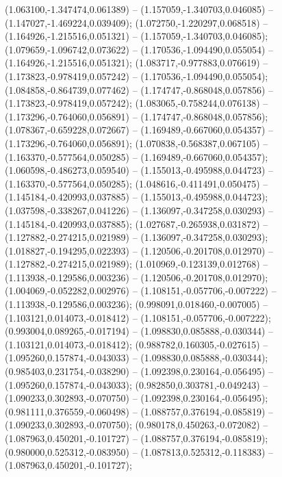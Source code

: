  (1.063100,-1.347474,0.061389) -- (1.157059,-1.340703,0.046085) -- (1.147027,-1.469224,0.039409);
 (1.072750,-1.220297,0.068518) -- (1.164926,-1.215516,0.051321) -- (1.157059,-1.340703,0.046085);
 (1.079659,-1.096742,0.073622) -- (1.170536,-1.094490,0.055054) -- (1.164926,-1.215516,0.051321);
 (1.083717,-0.977883,0.076619) -- (1.173823,-0.978419,0.057242) -- (1.170536,-1.094490,0.055054);
 (1.084858,-0.864739,0.077462) -- (1.174747,-0.868048,0.057856) -- (1.173823,-0.978419,0.057242);
 (1.083065,-0.758244,0.076138) -- (1.173296,-0.764060,0.056891) -- (1.174747,-0.868048,0.057856);
 (1.078367,-0.659228,0.072667) -- (1.169489,-0.667060,0.054357) -- (1.173296,-0.764060,0.056891);
 (1.070838,-0.568387,0.067105) -- (1.163370,-0.577564,0.050285) -- (1.169489,-0.667060,0.054357);
 (1.060598,-0.486273,0.059540) -- (1.155013,-0.495988,0.044723) -- (1.163370,-0.577564,0.050285);
 (1.048616,-0.411491,0.050475) -- (1.145184,-0.420993,0.037885) -- (1.155013,-0.495988,0.044723);
 (1.037598,-0.338267,0.041226) -- (1.136097,-0.347258,0.030293) -- (1.145184,-0.420993,0.037885);
 (1.027687,-0.265938,0.031872) -- (1.127882,-0.274215,0.021989) -- (1.136097,-0.347258,0.030293);
 (1.018827,-0.194295,0.022393) -- (1.120506,-0.201708,0.012970) -- (1.127882,-0.274215,0.021989);
 (1.010969,-0.123139,0.012768) -- (1.113938,-0.129586,0.003236) -- (1.120506,-0.201708,0.012970);
 (1.004069,-0.052282,0.002976) -- (1.108151,-0.057706,-0.007222) -- (1.113938,-0.129586,0.003236);
 (0.998091,0.018460,-0.007005) -- (1.103121,0.014073,-0.018412) -- (1.108151,-0.057706,-0.007222);
 (0.993004,0.089265,-0.017194) -- (1.098830,0.085888,-0.030344) -- (1.103121,0.014073,-0.018412);
 (0.988782,0.160305,-0.027615) -- (1.095260,0.157874,-0.043033) -- (1.098830,0.085888,-0.030344);
 (0.985403,0.231754,-0.038290) -- (1.092398,0.230164,-0.056495) -- (1.095260,0.157874,-0.043033);
 (0.982850,0.303781,-0.049243) -- (1.090233,0.302893,-0.070750) -- (1.092398,0.230164,-0.056495);
 (0.981111,0.376559,-0.060498) -- (1.088757,0.376194,-0.085819) -- (1.090233,0.302893,-0.070750);
 (0.980178,0.450263,-0.072082) -- (1.087963,0.450201,-0.101727) -- (1.088757,0.376194,-0.085819);
 (0.980000,0.525312,-0.083950) -- (1.087813,0.525312,-0.118383) -- (1.087963,0.450201,-0.101727);
